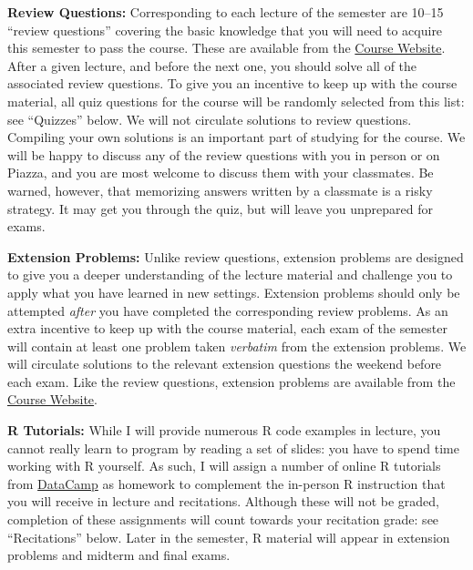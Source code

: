 \documentclass[11pt, letterpaper]{article}
\begin{document}
\medskip
\noindent \textbf{Review Questions:} 
Corresponding to each lecture of the semester are 10--15 ``review questions'' covering the basic knowledge that you will need to acquire this semester to pass the course.
These are available from the \href{http://ditraglia.com/Econ103Public}{Course Website}.
After a given lecture, and before the next one, you should solve all of the associated review questions. 
To give you an incentive to keep up with the course material, all quiz questions for the course will be randomly selected from this list: see ``Quizzes'' below.
We will not circulate solutions to review questions.
Compiling your own solutions is an important part of studying for the course.
We will be happy to discuss any of the review questions with you in person or on Piazza, and you are most welcome to discuss them with your classmates.
Be warned, however, that memorizing answers written by a classmate is a risky strategy.
It may get you through the quiz, but will leave you unprepared for exams.

\medskip
\noindent \textbf{Extension Problems:} 
Unlike review questions, extension problems are designed to give you a deeper understanding of the lecture material and challenge you to apply what you have learned in new settings.
Extension problems should only be attempted \emph{after} you have completed the corresponding review problems.
As an extra incentive to keep up with the course material, each exam of the semester will contain at least one problem taken \emph{verbatim} from the extension problems.
We will circulate solutions to the relevant extension questions the weekend before each exam.
Like the review questions, extension problems are available from the \href{http://ditraglia.com/Econ103Public}{Course Website}.

\medskip
\noindent \textbf{R Tutorials:}
While I will provide numerous R code examples in lecture, you cannot really learn to program by reading a set of slides: you have to spend time working with R yourself.
As such, I will assign a number of online R tutorials from \href{https://datacamp.com}{DataCamp} as homework to complement the in-person R instruction that you will receive in lecture and recitations.
Although these will not be graded, completion of these assignments will count towards your recitation grade: see ``Recitations'' below.
Later in the semester, R material will appear in extension problems and midterm and final exams.
\end{document}
